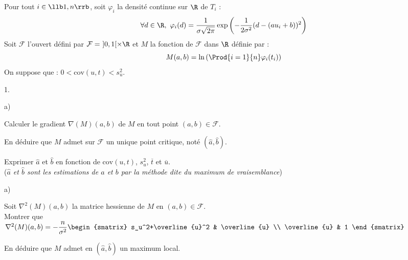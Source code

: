 \noindent
Pour tout $i \in \llb 1,n \rrb$, soit $\varphi_i$ la densité continue 
sur $\R$ de $T_i$ : 
\[
 \forall d \in \R, \ 
 \varphi_i(d)=\dfrac{1}{\sigma\sqrt{2\pi}}\exp\left(-\dfrac{1}{2\sigma^2
 } (d-(au_i+b))^2\right)
\]
Soit $\mathcal{F}$ l'ouvert défini par $\mathcal{F}= \ ]0,1[ \times \R$ 
et 
$M$ la fonction de $\mathcal{F}$ dans $\R$ définie par :
\[
 M(a,b)=\ln\left(\Prod{i=1}{n} \varphi_i(t_i)\right)
\]
On suppose que : $0 < \mathrm{cov}(u,t) < s_u^2$.

\begin{noliste}{1.}
 \setlength{\itemsep}{4mm}
 \setcounter{enumi}{9}
 \item 
 \begin{noliste}{a)}
  \setlength{\itemsep}{2mm}
  \item Calculer le gradient $\nabla(M)(a,b)$ de $M$ en tout point 
  $(a,b) \in \mathcal{F}$.
  
  
  
  
  
  

  
  \item En déduire que $M$ admet sur $\mathcal{F}$ un unique point 
  critique, noté $(\hat{a},\hat{b})$.
  
  
  
  \item Exprimer $\hat{a}$ et $\hat{b}$ en fonction de 
  $\mathrm{cov}(u,t)$, $s_u^2$, $\overline{t}$ et $\overline{u}$.\\
  ({\it $\hat{a}$ et $\hat{b}$ sont les estimations de $a$ et $b$ par 
  la méthode dite du maximum de vraisemblance})
  
  

 \end{noliste}
 
 \item 
 \begin{noliste}{a)}
  \setlength{\itemsep}{2mm}
  \item Soit $\nabla^2(M)(a,b)$ la matrice hessienne de $M$ en $(a,b) 
  \in \mathcal{F}$. \\
  Montrer que $\nabla^2(M)(a,b) = -\dfrac{n}{\sigma^2}
  \begin{smatrix}
   s_u^2+\overline{u}^2 & \overline{u} \\
   \overline{u} & 1
  \end{smatrix}$
  
  
    
  \item En déduire que $M$ admet en $(\hat{a},\hat{b})$ un maximum 
  local.
  

\end{noliste}
\end{noliste}
